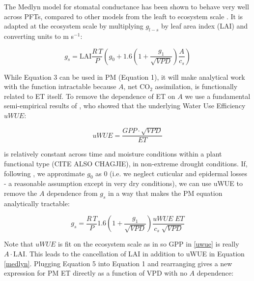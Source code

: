 \documentclass[draft,linenumbers]{agujournal}
\begin{document}
The Medlyn model for stomatal conductance has been shown to behave very well across PFTs, compared to other models from the leaft to ecosystem scale \citep{Lin_2015, CITE ZHOU ET AL AS WELL}. It is adapted at the ecosystem scale by multiplying $g_{l-s}$ by leaf area index (LAI) and converting units to m s$^{-1}$:

\begin{linenomath*}
  \label{medlyn}
  \begin{equation}
  g_s = \text{LAI} \frac{R \,T}{P} \left( g_0 + 1.6 \left(1 + \frac{g_1}{\sqrt{VPD}}\right) \frac{A}{c_s}\right)
  \end{equation}
\end{linenomath*}

While Equation 3 can be used in PM (Equation 1), it will make analytical work with the function intractable because $A$, net CO$_2$ assimilation, is functionally related to ET itself. To remove the dependence of ET on $A$ we use a fundamental semi-empirical results of \citet{Zhou_2015}, who showed that the underlying Water Use Efficiency $uWUE$:

\begin{linenomath*}
  \begin{equation}
    \label{uwue}
uWUE = \frac{GPP \cdot \sqrt{VPD}}{ET}
  \end{equation}
\end{linenomath*}
is relatively constant across time and moisture conditions within a plant functional type (CITE ALSO CHAGJIE), in non-extreme drought conditions. If, following \citet{Lin_2015}, we approximate $g_0$ as $0$ (i.e. we neglect cuticular and epidermal losses - a reasonable assumption except in very dry conditions), we can use uWUE to remove the $A$ dependence from $g_s$ in a way that makes the PM equation analytically tractable:

\begin{linenomath*}
  \begin{equation}
  g_s = \frac{R \, T}{P} 1.6 \left(1 + \frac{g_1}{\sqrt{VPD}}\right) \frac{uWUE \; ET}{c_s \; \sqrt{VPD}}
  \end{equation}
\end{linenomath*}

Note that $uWUE$ is fit on the ecosystem scale as in \citet{Zhou_2015} so GPP in \ref{uwue} is really $A\cdot \text{LAI}$. This leads to the cancellation of LAI in addition to uWUE in Equation \ref{medlyn}. Plugging Equation 5 into Equation 1 and rearranging gives a new expression for PM ET directly as a function of VPD with no $A$ dependence:
\end{document}
